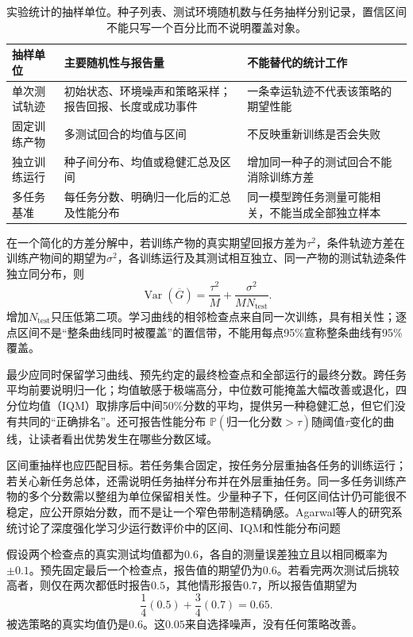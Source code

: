 \begin{table}[t]
  \centering
  \small
  \begin{tabularx}{\linewidth}{>{\raggedright\arraybackslash}p{26mm} >{\raggedright\arraybackslash}X >{\raggedright\arraybackslash}X}
    \toprule
    抽样单位 & 主要随机性与报告量 & 不能替代的统计工作 \\
    \midrule
    单次测试轨迹 & 初始状态、环境噪声和策略采样；报告回报、长度或成功事件 & 一条幸运轨迹不代表该策略的期望性能 \\
    固定训练产物 & 多测试回合的均值与区间 & 不反映重新训练是否会失败 \\
    独立训练运行 & 种子间分布、均值或稳健汇总及区间 & 增加同一种子的测试回合不能消除训练方差 \\
    多任务基准 & 每任务分数、明确归一化后的汇总及性能分布 & 同一模型跨任务测量可能相关，不能当成全部独立样本 \\
    \bottomrule
  \end{tabularx}
  \caption{实验统计的抽样单位。种子列表、测试环境随机数与任务抽样分别记录，置信区间不能只写一个百分比而不说明覆盖对象。}
  \label{tab:rl-learning-statistical-units}
\end{table}

在一个简化的方差分解中，若训练产物的真实期望回报方差为$\tau^2$，条件轨迹方差在训练产物间的期望为$\sigma^2$，各训练运行及其测试相互独立、同一产物的测试轨迹条件独立同分布，则
\[
 \operatorname{Var}(\overline G)
   =\frac{\tau^2}{M}
      +\frac{\sigma^2}{M N_{\mathrm{test}}}.
\]
增加$N_{\mathrm{test}}$只压低第二项。学习曲线的相邻检查点来自同一次训练，具有相关性；逐点区间不是“整条曲线同时被覆盖”的置信带，不能用每点95\%宣称整条曲线有95\%覆盖。

最少应同时保留学习曲线、预先约定的最终检查点和全部运行的最终分数。跨任务平均前要说明归一化；均值敏感于极端高分，中位数可能掩盖大幅改善或退化，四分位均值（IQM）取排序后中间50\%分数的平均，提供另一种稳健汇总，但它们没有共同的“正确排名”。还可报告性能分布
$\mathbb P(\text{归一化分数}>\tau)$随阈值$\tau$变化的曲线，让读者看出优势发生在哪些分数区域。

区间重抽样也应匹配目标。若任务集合固定，按任务分层重抽各任务的训练运行；若关心新任务总体，还需说明任务抽样分布并在外层重抽任务。同一多任务训练产物的多个分数需以整组为单位保留相关性。少量种子下，任何区间估计仍可能很不稳定，应公开原始分数，而不是让一个窄色带制造精确感。Agarwal等人的研究系统讨论了深度强化学习少运行数评价中的区间、IQM和性能分布问题

\begin{example}[挑最好检查点造成的偏差]
  \label{ex:rl-learning-checkpoint-selection}
  假设两个检查点的真实测试均值都为$0.6$，各自的测量误差独立且以相同概率为$\pm0.1$。预先固定最后一个检查点，报告值的期望仍为$0.6$。若看完两次测试后挑较高者，则仅在两次都低时报告$0.5$，其他情形报告$0.7$，所以报告值期望为
  \[
    \frac14(0.5)+\frac34(0.7)=0.65.
  \]
  被选策略的真实均值仍是$0.6$。这$0.05$来自选择噪声，没有任何策略改善。
\end{example}

